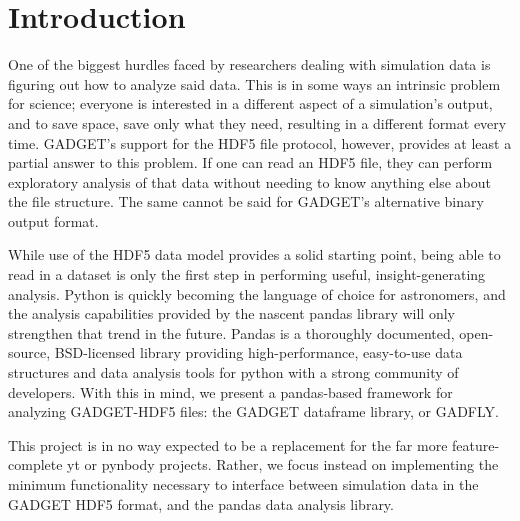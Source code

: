 \section{Introduction}
\label{intro}

One of the biggest hurdles faced by researchers dealing with simulation data is figuring out how to analyze said data.  This is in some ways an intrinsic problem for science; everyone is interested in a different aspect of a simulation’s output, and to save space, save only what they need, resulting in a different format every time.  GADGET’s support for the HDF5 file protocol, however, provides at least a partial answer to this problem.  If one can read an HDF5 file, they can perform exploratory analysis of that data without needing to know anything else about the file structure.  The same cannot be said for GADGET’s alternative binary output format.  

While use of the HDF5 data model provides a solid starting point, being able to read in a dataset is only the first step in performing useful, insight-generating analysis.  Python is quickly becoming the language of choice for astronomers, and the analysis capabilities provided by the nascent pandas library will only strengthen that trend in the future.  Pandas is a thoroughly documented, open-source, BSD-licensed library providing high-performance, easy-to-use data structures and data analysis tools for python with a strong community of developers. With this in mind, we present a pandas-based framework for analyzing GADGET-HDF5 files: the GADGET dataframe library, or GADFLY.

This project is in no way expected to be a replacement for the far more feature-complete yt or pynbody projects. Rather, we focus instead on implementing the minimum functionality necessary to interface between simulation data in the GADGET HDF5 format, and the pandas data analysis library.